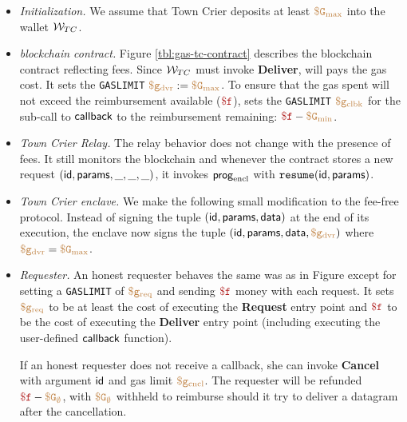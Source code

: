 \begin{itemize}[leftmargin=1.5em]
  \setlength{\itemsep}{2pt}
  \setlength{\parskip}{0pt}
  \setlength{\parsep}{0pt}
  \item {\it Initialization.}
    We assume that Town Crier deposits at least $\tt {\color{brown} \$G_\text{max} }$ into the wallet ${\cal W}_{TC}$.

  \item {\it \tcs blockchain contract.}
    Figure \ref{tbl:gas-tc-contract} describes the \tcs blockchain contract reflecting fees.
    Since ${\cal W}_{TC}$ must invoke {\bf Deliver}, \tc will pays the gas cost.
    It sets the {\tt GASLIMIT} $\tt {\color{brown} \$g_\text{dvr} } := \tt {\color{brown} \$G_\text{max} }$.
    To ensure that the gas spent will not exceed the reimbursement available ($\fee$),
    \tcont sets the {\tt GASLIMIT} $\tt {\color{brown} \$g_\text{clbk} }$ for the sub-call to ${\sf callback}$ to the reimbursement remaining: $\fee - \constgasmin$.

  \item {\it Town Crier Relay.}
    The relay behavior does not change with the presence of fees.
    It still monitors the blockchain and whenever the contract \tcont stores a new request $({\sf id}, {\sf params}, \_, \_, \_)$,
    it invokes ${\sf prog}_{\textrm{encl}}$ with $\texttt{resume}({\sf id}, {\sf params})$.

  \item {\it Town Crier enclave.}
    We make the following small modification to the fee-free protocol.
    Instead of signing the tuple $({\sf id}, {\sf params}, {\sf data})$ at the end of its execution,
    the enclave now signs the tuple $({\sf id}, {\sf params}, {\sf data}, \tt {\color{brown} \$g_\text{dvr} })$ where $\tt {\color{brown} \$g_\text{dvr} } = \tt {\color{brown} \$G_\text{max} }$.

  \item {\it Requester.}
    An honest requester behaves the same was as in Figure  except for setting a {\tt GASLIMIT} of $\tt {\color{brown} \$g_\text{req} }$ and sending $\fee$ money with each request.
    It sets $\tt {\color{brown} \$g_\text{req} }$ to be at least the cost of executing the {\bf Request} entry point
    and $\fee$ to be the cost of executing the {\bf Deliver} entry point (including executing the user-defined ${\sf callback}$ function).

    If an honest requester does not receive a callback, she can invoke {\bf Cancel} with argument ${\sf id}$ and gas limit $\tt {\color{brown} \$g_\text{cncl} }$.
    The requester will be refunded $\fee - \constgascancel$, with $\tt {\color{brown} \$G_\emptyset }$ withheld to reimburse \tc
    should it try to deliver a datagram after the cancellation.
\end{itemize}

